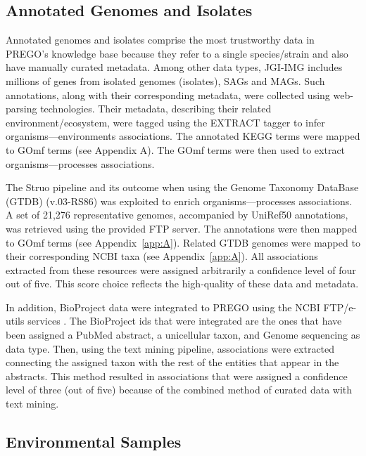    \subsection{Annotated Genomes and Isolates}
   \label{subsec:prego-isolates}

   Annotated genomes and isolates comprise the most trustworthy data in PREGO's knowledge base because they refer to a single species/strain and also have manually curated metadata. 
   Among other data types, JGI-IMG \cite{chen2021img, mukherjee2021genomes} includes millions of genes from isolated genomes (isolates), SAGs and MAGs. Such annotations, along with their corresponding metadata, were collected using web-parsing technologies. Their metadata, describing their related environment/ecosystem, were tagged using the EXTRACT tagger to infer organisms—environments associations. The annotated KEGG terms were mapped to GOmf terms (see Appendix A). The GOmf terms were then used to extract organisms—processes associations.
   
   The Struo pipeline \cite{de2020struo} and its outcome when using the Genome Taxonomy DataBase (GTDB) (v.03-RS86) \cite{parks2020complete} was exploited to enrich organisms—processes associations. 
   A set of 21,276 representative genomes, accompanied by UniRef50 annotations, was retrieved using the provided FTP server. The annotations were then mapped to GOmf terms (see Appendix~\ref{app:A}). 
   Related GTDB genomes were mapped to their corresponding NCBI taxa (see Appendix~\ref{app:A}). 
   All associations extracted from these resources were assigned arbitrarily a confidence level of four out of five. 
   This score choice reflects the high-quality of these data and metadata.
   
   In addition, BioProject data were integrated to PREGO using the NCBI FTP/e-utils services \cite{sayers2021database}. 
   The BioProject ids that were integrated are the ones that have been assigned a PubMed abstract, a unicellular taxon, and Genome sequencing as data type. Then, using the text mining pipeline, associations were extracted connecting the assigned taxon with the rest of the entities that appear in the abstracts. This method resulted in associations that were assigned a confidence level of three (out of five) because of the combined method of curated data with text mining.


   \subsection{Environmental Samples}
   \label{subsec:prego-envsamples}

